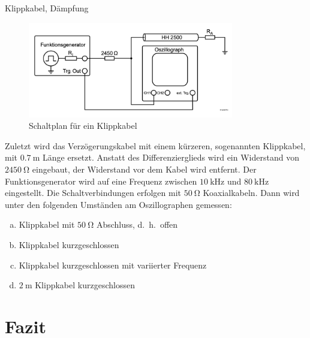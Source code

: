\documentclass[ngerman]{scrartcl}
\theoremstyle{definition}
\begin{document}
		\begin{aufgabe}{Klippkabel, Dämpfung}
			\begin{figure}[h!]
				\centering
				\includegraphics[width=0.8\textwidth]{figs/Aufbau_1_4_Klippkabel.png}
				\caption{Schaltplan für ein Klippkabel~\cite{anleitung}}
				\label{fig:aufbau_1_4_klippkabel}
			\end{figure}
			Zuletzt wird das Verzögerungskabel mit einem kürzeren, sogenannten Klippkabel, mit $\SI{0.7}{\meter}$ Länge ersetzt. Anstatt des Differenzierglieds wird ein Widerstand von $\SI{2450}{\ohm}$ eingebaut, der Widerstand vor dem Kabel wird entfernt. Der Funktionsgenerator wird auf eine Frequenz zwischen $\SI{10}{\kilo\hertz}$ und $\SI{80}{\kilo\hertz}$ eingestellt. Die Schaltverbindungen erfolgen mit $\SI{50}{\ohm}$ Koaxialkabeln. Dann wird unter den folgenden Umständen am Oszillographen gemessen:
			\begin{enumerate}[(a)]
				\item Klippkabel mit $\SI{50}{\ohm}$ Abschluss, d.\ h.\ offen
				\item Klippkabel kurzgeschlossen
				\item Klippkabel kurzgeschlossen mit variierter Frequenz
				\item $\SI{2}{\meter}$ Klippkabel kurzgeschlossen 
			\end{enumerate}
		\end{aufgabe}
		

	\section{Fazit}
	\printbibliography
\end{document}

